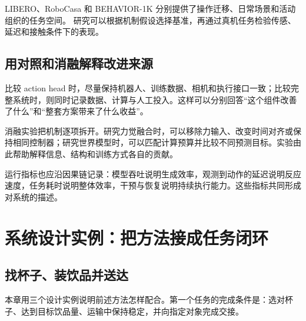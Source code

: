 \documentclass[UTF8,a4paper,11pt,oneside,openany,fontset=none]{ctexbook}
\begin{document}
LIBERO、RoboCasa 和 BEHAVIOR-1K 分别提供了操作迁移、日常场景和活动组织的任务空间。\cite{R39}\cite{R40}\cite{R41} 研究可以根据机制假设选择基准，再通过真机任务检验传感、延迟和接触条件下的表现。

\section{用对照和消融解释改进来源}

比较 action head 时，尽量保持机器人、训练数据、相机和执行接口一致；比较完整系统时，则同时记录数据、计算与人工投入。这样可以分别回答``这个组件改善了什么''和``整套方案带来了什么收益''。

消融实验把机制逐项拆开。研究力觉融合时，可以移除力输入、改变时间对齐或保持相同控制器；研究世界模型时，可以匹配计算预算并比较不同预测目标。实验由此帮助解释信息、结构和训练方式各自的贡献。

运行指标也应沿因果链记录：模型吞吐说明生成效率，观测到动作的延迟说明反应速度，任务耗时说明整体效率，干预与恢复说明持续执行能力。这些指标共同形成对系统的描述。

\chapter{系统设计实例：把方法接成任务闭环}

\section{找杯子、装饮品并送达}

本章用三个设计实例说明前述方法怎样配合。第一个任务的完成条件是：选对杯子、达到目标饮品量、运输中保持稳定，并向指定对象完成交接。
\end{document}
